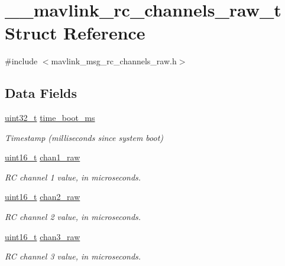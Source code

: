 \hypertarget{struct____mavlink__rc__channels__raw__t}{\section{\-\_\-\-\_\-mavlink\-\_\-rc\-\_\-channels\-\_\-raw\-\_\-t Struct Reference}
\label{struct____mavlink__rc__channels__raw__t}
}


{\ttfamily \#include $<$mavlink\-\_\-msg\-\_\-rc\-\_\-channels\-\_\-raw.\-h$>$}

\subsection*{Data Fields}
\begin{DoxyCompactItemize}
\item 
\hyperlink{stdint_8h_a435d1572bf3f880d55459d9805097f62}{uint32\-\_\-t} \hyperlink{struct____mavlink__rc__channels__raw__t_aceced8c76bb7171ce4f03c0b633f7a5f}{time\-\_\-boot\-\_\-ms}
\begin{DoxyCompactList}\small\item\em Timestamp (milliseconds since system boot) \end{DoxyCompactList}\item 
\hyperlink{stdint_8h_a273cf69d639a59973b6019625df33e30}{uint16\-\_\-t} \hyperlink{struct____mavlink__rc__channels__raw__t_a61bd698c061cfaa1da0b02d3ee390f4e}{chan1\-\_\-raw}
\begin{DoxyCompactList}\small\item\em R\-C channel 1 value, in microseconds. \end{DoxyCompactList}\item 
\hyperlink{stdint_8h_a273cf69d639a59973b6019625df33e30}{uint16\-\_\-t} \hyperlink{struct____mavlink__rc__channels__raw__t_a87484f764dc99860781a6a29a07f9a7a}{chan2\-\_\-raw}
\begin{DoxyCompactList}\small\item\em R\-C channel 2 value, in microseconds. \end{DoxyCompactList}\item 
\hyperlink{stdint_8h_a273cf69d639a59973b6019625df33e30}{uint16\-\_\-t} \hyperlink{struct____mavlink__rc__channels__raw__t_af56e588a0dcc66fbf2fdb61b5995060c}{chan3\-\_\-raw}
\begin{DoxyCompactList}\small\item\em R\-C channel 3 value, in microseconds. \end{DoxyCompactList}\item 

\end{DoxyCompactItemize}
